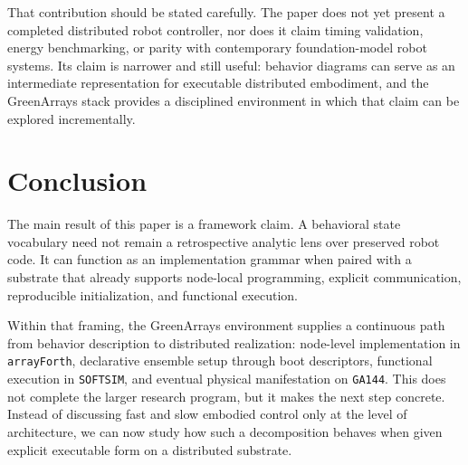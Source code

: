 \documentclass[11pt]{article}
\begin{document}
That contribution should be stated carefully. The paper does not yet present
a completed distributed robot controller, nor does it claim timing
validation, energy benchmarking, or parity with contemporary foundation-model
robot systems. Its claim is narrower and still useful: behavior diagrams can
serve as an intermediate representation for executable distributed
embodiment, and the GreenArrays stack provides a disciplined environment in
which that claim can be explored incrementally.

\section{Conclusion}

The main result of this paper is a framework claim. A behavioral state
vocabulary need not remain a retrospective analytic lens over preserved robot
code. It can function as an implementation grammar when paired with a
substrate that already supports node-local programming, explicit
communication, reproducible initialization, and functional execution.

Within that framing, the GreenArrays environment supplies a continuous path
from behavior description to distributed realization: node-level
implementation in \texttt{arrayForth}, declarative ensemble setup through
boot descriptors, functional execution in \texttt{SOFTSIM}, and eventual
physical manifestation on \texttt{GA144}. This does not complete the larger
research program, but it makes the next step concrete. Instead of discussing
fast and slow embodied control only at the level of architecture, we can now
study how such a decomposition behaves when given explicit executable form on
a distributed substrate.



\end{document}
